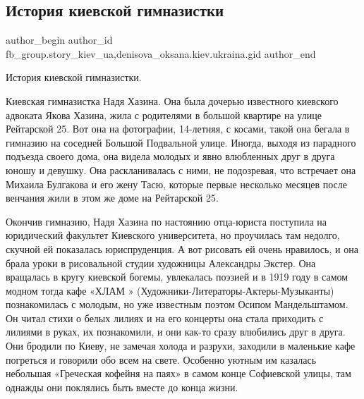  
 
 
 
 
 
\subsection{История киевской гимназистки}
\label{sec:18_02_2021.fb.fb_group.story_kiev_ua.3.gimnazistka}
 
\ifcmt
 author_begin
   author_id fb_group.story_kiev_ua,denisova_oksana.kiev.ukraina.gid
 author_end
\fi

История киевской гимназистки.

Киевская гимназистка Надя Хазина. Она была дочерью известного киевского
адвоката Якова Хазина, жила с родителями в большой квартире на улице Рейтарской
25. Вот она на фотографии, 14-летняя, с косами, такой она бегала в гимназию на
соседней Большой Подвальной улице.  Иногда, выходя из парадного подъезда своего
дома, она видела молодых и явно влюбленных друг в друга юношу и девушку. Она
раскланивалась с ними, не подозревая, что встречает она Михаила Булгакова и его
жену Тасю, которые первые несколько месяцев после венчания жили в этом же доме
на Рейтарской 25. 


Окончив гимназию, Надя Хазина по настоянию отца-юриста поступила на юридический
факультет Киевского университета, но проучилась там недолго, скучной ей
показалась юриспруденция. А вот рисовать ей очень нравилось,  и она брала уроки
в рисовальной студии художницы Александры Экстер. Она вращалась в кругу
киевской богемы,  увлекалась поэзией и в 1919 году в самом модном тогда кафе
«ХЛАМ » (Художники-Литераторы-Актеры-Музыканты) познакомилась с молодым, но уже
известным поэтом Осипом Мандельштамом. Он читал стихи о белых лилиях и на его
концерты она стала приходить с лилиями в руках, их познакомили,  и они как-то
сразу влюбились друг в друга. Они бродили по Киеву, не замечая холода и
разрухи, заходили в маленькие кафе погреться и говорили обо всем на свете.
Особенно уютным им казалась небольшая «Греческая кофейня на паях» в самом конце
Софиевской улицы, там однажды они поклялись быть вместе до конца жизни.


